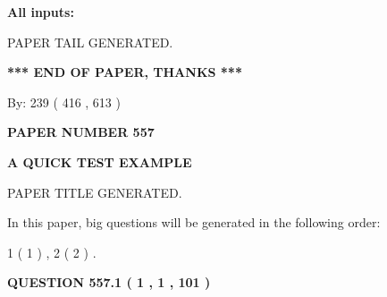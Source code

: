 \documentclass[12pt]{article}
\begin{document}
   
   
   
\noindent{}
   
   
   
   
\noindent\vspace{0.1in}\hspace{-0.08in} {\textbf{\Large{All inputs: }}}
   
   
   
   
   
   
 \vspace{0.2in}
 
   
   
\vspace{2.0in} PAPER TAIL GENERATED.
   
   
   
   
\vspace{1.0in} 
{\textbf{\large{ *** END OF PAPER, THANKS *** }}} 
   
   
\hspace{1.0in} By: 
 239 ( 416 ,  613 )
   
   
   
   
\newpage 
\setcounter{page}{ 
   557001 } 
   
   
   
   
 {\textbf{ \Large{ PAPER NUMBER  557  }}}
   
   
\vspace{0.2in}
   
   
   
   
   
   
   
   
 \vspace{0.2in}
{\LARGE {\textbf{ A QUICK TEST EXAMPLE}}}
   
   
 PAPER TITLE GENERATED.
   
   
   
\vspace{0.2in}
   
In this paper, big questions will be generated in the following order: 
   
   
   1 ( 1 )
 ,
   2 ( 2 )
 .
  
\vspace{0.2in}
  
{\textbf{\Large{QUESTION
557.1 
 ( 1 , 1 , 101 )
}}}
  
  
 
\end{document}
